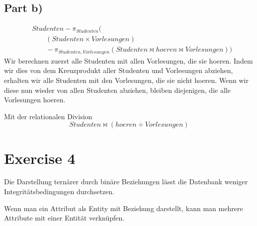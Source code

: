 \documentclass[10pt,a4paper]{article}
\begin{document}
\subsection*{Part b)}

\begin{align*}
  & Studenten - \pi_{Studenten}(\\
  & \qquad (Studenten \times Vorlesungen)\\
  & \qquad - \pi_{Studenten, Vorlesungen}(Studenten \bowtie hoeren \bowtie Vorlesungen))
\end{align*}
Wir berechnen zuerst alle Studenten mit allen Vorlesungen, die sie hoeren.
Indem wir dies von dem Kreuzprodukt aller Studenten und Vorlesungen abziehen, erhalten wir alle Studenten mit den Vorlesungen, die sie nicht hoeren.
Wenn wir diese nun wieder von allen Studenten abziehen, bleiben diejenigen, die alle Vorlesungen hoeren.

Mit der relationalen Division
\begin{equation*}
  Studenten \bowtie (hoeren \div Vorlesungen)
\end{equation*}

\section*{Exercise 4}

Die Darstellung ternärer durch binäre Beziehungen lässt die Datenbank weniger Integritätsbedingungen durchsetzen.

Wenn man ein Attribut als Entity mit Beziehung darstellt, kann man mehrere Attribute mit einer Entität verknüpfen.
\end{document}
